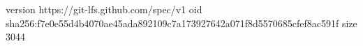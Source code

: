 version https://git-lfs.github.com/spec/v1
oid sha256:f7e0e55d4b4070ae45ada892109c7a173927642a071f8d5570685cfef8ac591f
size 3044
